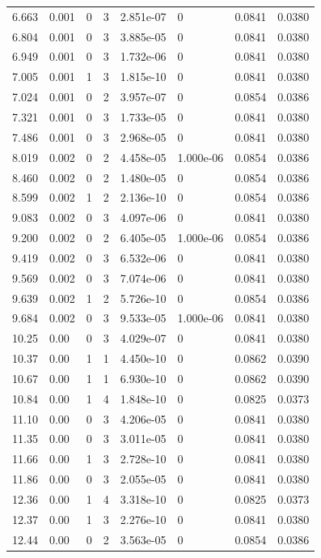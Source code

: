 \documentclass[preview]{standalone}
\begin{document}
{{\begin{tabular}{L{1.2cm}C{1.2cm} C{0.3cm}C{0.5cm} C{1.4cm}C{1.4cm} C{1.4cm}C{1.4cm}}
  6.663  &  0.001  & 0     &  3 &  2.851e-07  & 0  & 0.0841 &  0.0380   \\ 
  6.804  &  0.001  & 0     &  3 &  3.885e-05  & 0  & 0.0841 &  0.0380   \\ 
  6.949  &  0.001  & 0     &  3 &  1.732e-06  & 0  & 0.0841 &  0.0380   \\ 
  7.005  &  0.001  & 1     &  3 &  1.815e-10  & 0  & 0.0841 &  0.0380   \\ 
  7.024  &  0.001  & 0     &  2 &  3.957e-07  & 0  & 0.0854 &  0.0386   \\ 
  7.321  &  0.001  & 0     &  3 &  1.733e-05  & 0  & 0.0841 &  0.0380   \\ 
  7.486  &  0.001  & 0     &  3 &  2.968e-05  & 0  & 0.0841 &  0.0380   \\ 
  8.019  &  0.002  & 0     &  2 &  4.458e-05  & 1.000e-06  & 0.0854 &  0.0386   \\ 
  8.460  &  0.002  & 0     &  2 &  1.480e-05  & 0  & 0.0854 &  0.0386   \\ 
  8.599  &  0.002  & 1     &  2 &  2.136e-10  & 0  & 0.0854 &  0.0386   \\ 
  9.083  &  0.002  & 0     &  3 &  4.097e-06  & 0  & 0.0841 &  0.0380   \\ 
  9.200  &  0.002  & 0     &  2 &  6.405e-05  & 1.000e-06  & 0.0854 &  0.0386   \\ 
  9.419  &  0.002  & 0     &  3 &  6.532e-06  & 0  & 0.0841 &  0.0380   \\ 
  9.569  &  0.002  & 0     &  3 &  7.074e-06  & 0  & 0.0841 &  0.0380   \\ 
  9.639  &  0.002  & 1     &  2 &  5.726e-10  & 0  & 0.0854 &  0.0386   \\ 
  9.684  &  0.002  & 0     &  3 &  9.533e-05  & 1.000e-06  & 0.0841 &  0.0380   \\ 
  10.25  &  0.00  & 0     &  3 &  4.029e-07  & 0  & 0.0841 &  0.0380   \\ 
  10.37  &  0.00  & 1     &  1 &  4.450e-10  & 0  & 0.0862 &  0.0390   \\ 
  10.67  &  0.00  & 1     &  1 &  6.930e-10  & 0  & 0.0862 &  0.0390   \\ 
  10.84  &  0.00  & 1     &  4 &  1.848e-10  & 0  & 0.0825 &  0.0373   \\ 
  11.10  &  0.00  & 0     &  3 &  4.206e-05  & 0  & 0.0841 &  0.0380   \\ 
  11.35  &  0.00  & 0     &  3 &  3.011e-05  & 0  & 0.0841 &  0.0380   \\ 
  11.66  &  0.00  & 1     &  3 &  2.728e-10  & 0  & 0.0841 &  0.0380   \\ 
  11.86  &  0.00  & 0     &  3 &  2.055e-05  & 0  & 0.0841 &  0.0380   \\ 
  12.36  &  0.00  & 1     &  4 &  3.318e-10  & 0  & 0.0825 &  0.0373   \\ 
  12.37  &  0.00  & 1     &  3 &  2.276e-10  & 0  & 0.0841 &  0.0380   \\ 
  12.44  &  0.00  & 0     &  2 &  3.563e-05  & 0  & 0.0854 &  0.0386   \\ 
\hline 
\end{tabular} 

}}
\end{document}
